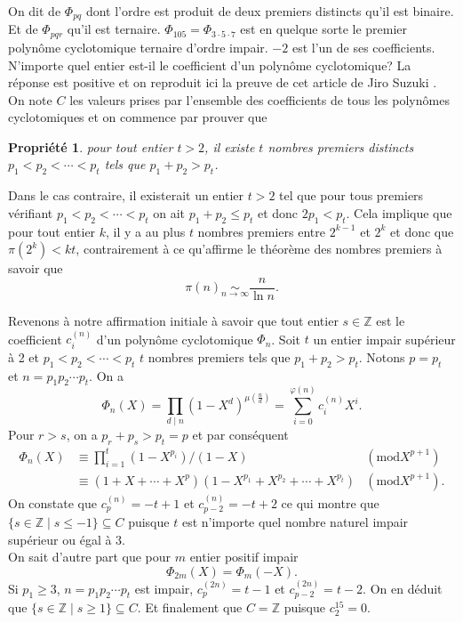 \documentclass{article}
\theoremstyle{break}                  %
\newtheorem{propriete}{Propriété}
\begin{document}
On dit de $\Phi_{pq}$ dont l'ordre est produit de deux premiers distincts qu'il est binaire. Et de $\Phi_{pqr}$ qu'il est ternaire. $\Phi_{105} = \Phi_{3 \cdot 5 \cdot 7}$ est en quelque sorte le premier polynôme cyclotomique ternaire d'ordre impair. $-2$ est l'un de ses coefficients. N'importe quel entier est-il le coefficient d'un polynôme cyclotomique? La réponse est positive et on reproduit ici la preuve de cet article de Jiro Suzuki \cite{range}.\\

On note $C$ les valeurs prises par l'ensemble des coefficients de tous les polynômes cyclotomiques et on commence par prouver que
\begin{propriete}
	pour tout entier $t > 2$, il existe $t$ nombres premiers distincts $p_1 < p_2 < \cdots < p_t$ tels que $p_1+p_2 > p_t$.
\end{propriete}
Dans le cas contraire, il existerait un entier $t > 2$ tel que pour tous premiers vérifiant $p_1 < p_2 < \cdots < p_t$ on ait $p_1+p_2 \le p_t$ et donc $2 p_1 < p_t$. Cela implique que pour tout entier $k$, il y a au plus $t$ nombres premiers entre $2^{k-1}$ et $2^k$ et donc que $\pi(2^k) < kt$, contrairement à ce qu'affirme le théorème des nombres premiers à savoir que 
$$\pi(n) \underset{n \to \infty}{\sim} \frac{n}{\ln n}.$$

Revenons à notre affirmation initiale à savoir que tout entier $s \in \mathbb Z$ est le coefficient $c_i^{(n)}$ d'un polynôme cyclotomique $\Phi_n$. Soit $t$ un entier impair supérieur à 2 et $p_1 < p_2 < \cdots < p_t$ $t$ nombres premiers tels que $p_1+p_2 > p_t$. Notons $p = p_t$ et $n = p_1 p_2 \cdots p_t$. On a
$$\Phi_n(X) = \prod_{d \mid n} (1-X^d)^{\mu(\frac{n}{d})} = \sum_{i = 0}^{\varphi(n)} c_i^{(n)} X^i.$$
Pour $r > s$, on a $p_r + p_s > p_t = p$ et par conséquent
\begin{align*}
	\Phi_n(X) &\equiv \prod_{i=1}^{t} (1-X^{p_i})/(1-X) &(\mathrm{mod}X^{p+1})\\
	&\equiv (1 + X + \cdots + X^p)(1 - X^{p_1}+X^{p_2}+\cdots+X^{p_t})  &(\mathrm{mod}X^{p+1}).
\end{align*}
On constate que $c_p^{(n)}=-t+1$ et $c_{p-2}^{(n)}=-t+2$ ce qui montre que $\{s \in \mathbb Z \mid s \le -1\} \subseteq C$ puisque $t$ est n'importe quel nombre naturel impair supérieur ou égal à $3$.\\

On sait d'autre part que pour $m$ entier positif impair
$$\Phi_{2m}(X) = \Phi_m(-X).$$
Si $p_1 \ge 3$, $n = p_1 p_2 \cdots p_t$ est impair, $c_p^{(2n)}=t-1$ et $c_{p-2}^{(2n)}=t-2$. On en déduit que $\{s \in \mathbb Z \mid s \ge 1\} \subseteq C$. Et finalement que $C = \mathbb Z$ puisque $c_2^{15} = 0$.\\
\end{document}
